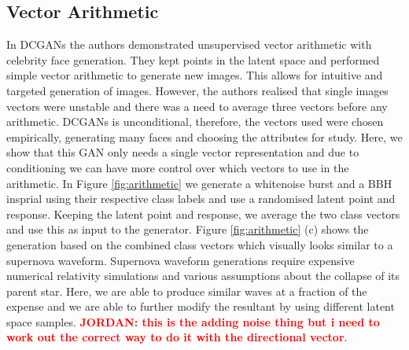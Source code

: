 \documentclass[12pt]{iopart}
\newcommand{\jordan}[1]{\textbf{\textcolor{red}{JORDAN: #1}}}
\begin{document}

\subsection{Vector Arithmetic}
In DCGANs the authors demonstrated unsupervised vector arithmetic with celebrity face generation. They kept points in the latent space and performed simple vector arithmetic to generate new images. This allows for intuitive and targeted generation of images. However, the authors realised that single images vectors were unstable and there was a need to average three vectors before any arithmetic. DCGANs is unconditional, therefore, the vectors used were chosen empirically, generating many faces and choosing the attributes for study. Here, we show that this GAN only needs a single vector representation and due to conditioning we can have more control over which vectors to use in the arithmetic. In Figure \ref{fig:arithmetic} we generate a whitenoise burst and a BBH insprial using their respective class labels and use a randomised latent point and response. Keeping the latent point and response, we average the two class vectors and use this as input to the generator. Figure \ref{fig:arithmetic} (c) shows the generation based on the combined class vectors which visually looks similar to a supernova waveform. Supernova waveform generations require expensive numerical relativity simulations and various assumptions about the collapse of its parent star. Here, we are able to produce similar waves at a fraction of the expense and we are able to further modify the resultant by using different latent space samples. \jordan{this is the adding noise thing but i need to work out the correct way to do it with the directional vector}. 
\end{document}
